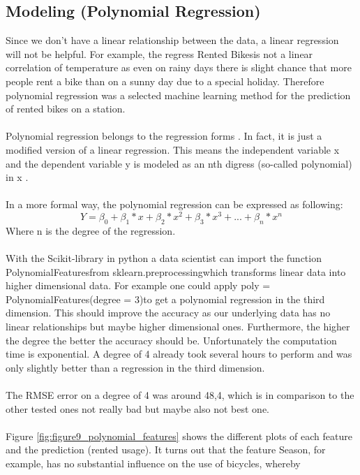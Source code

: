 \subsection{Modeling (Polynomial Regression)}\label{poly}
Since we don't have a linear relationship between the data, a linear regression will not be helpful.
For example, the regress \glqq Rented Bikes\grqq is not a linear correlation of temperature as even on rainy
days there is slight chance that more people rent a bike than on a sunny day due to a special
holiday. Therefore polynomial regression was a selected machine learning method for the
prediction of rented bikes on a station.\\\\
Polynomial regression belongs to the regression forms \cite{RN9}. In fact, it is just a modified version of a
linear regression. This means the independent variable x and the dependent variable y is modeled
as an nth digress (so-called polynomial) in x \cite{RN9}.\\\\
In a more formal way, the polynomial regression can be expressed as following:
$$Y=\beta_0+\beta_1* x+\beta_2 * x^2 + \beta_3 * x^3 + ... + \beta_n * x^n$$
Where n is the degree of the regression.\\\\
With the Scikit-library in python a data scientist can import the function \glqq PolynomialFeatures\grqq from
\glqq sklearn.preprocessing\grqq which transforms linear data into higher dimensional data. For example
one could apply \glqq poly = PolynomialFeatures(degree = 3)\grqq to get a polynomial
regression in the third dimension. This should improve the accuracy as our underlying data has
no linear relationships but maybe higher dimensional ones. Furthermore, the higher the degree
the better the accuracy should be. Unfortunately the computation time is exponential. A degree of
4 already took several hours to perform and was only slightly better than a regression in the third
dimension.\\\\
The RMSE error on a degree of 4 was around 48,4, which is in comparison to the other tested
ones not really bad but maybe also not best one.\\\\
Figure \ref{fig:figure9_polynomial_features} shows the different plots of each feature and the prediction (rented usage). It turns out
that the feature Season, for example, has no substantial influence on the use of bicycles, whereby
